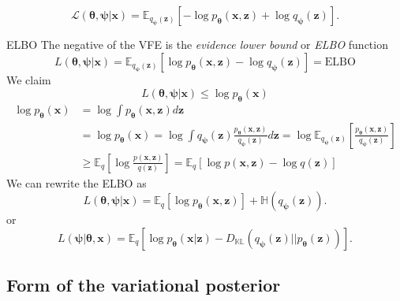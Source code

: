 \documentclass[../main.tex]{subfiles}
\begin{document}
\[
\mathcal{L}(\boldsymbol{\theta}, \boldsymbol{\psi} | \boldsymbol{x}) = \mathbb{E}_{q_{\boldsymbol{\psi}}(\boldsymbol{z})}  \left[ - \log p_{\boldsymbol{\theta}}(\boldsymbol{x}, \boldsymbol{z}) + \log q_{\boldsymbol{\psi}}(\boldsymbol{z}) \right] .
\]

\begin{note}{ELBO}
The negative of the VFE is the \emph{evidence lower bound} or \emph{ELBO} function
\[
L(\boldsymbol{\theta}, \boldsymbol{\psi} | \boldsymbol{x}) = \mathbb{E}_{q_{\boldsymbol{\psi}}(\boldsymbol{z})} \left[ \log p_{\boldsymbol{\theta}}(\boldsymbol{x}, \boldsymbol{z})  - \log q_{\boldsymbol{\psi}}(\boldsymbol{z}) \right]  = \text{ELBO}
\]
We claim
\[
L(\boldsymbol{\theta}, \boldsymbol{\psi} | \boldsymbol{x}) \le  \log p_{\boldsymbol{\theta}}(\boldsymbol{x})
\]
\[
\begin{aligned}
\log p_{\boldsymbol{\theta}}(\boldsymbol{x}) &= \log \int p_{\boldsymbol{\theta}}(\boldsymbol{x}, \boldsymbol{z}) d\boldsymbol{z} \\
&= \log p_{\boldsymbol{\theta}}(\boldsymbol{x}) = \log \int q_{\boldsymbol{\psi}}(\boldsymbol{z}) \frac{p_{\boldsymbol{\theta}}(\boldsymbol{x}, \boldsymbol{z})}{q_{\boldsymbol{\psi}}(\boldsymbol{z})}d\boldsymbol{z} = \log \mathbb{E}_{q_{\boldsymbol{\psi}}(\boldsymbol{z})} \left[ \frac{p_{\boldsymbol{\theta}}(\boldsymbol{x},\boldsymbol{z})}{q_{\boldsymbol{\psi}}(\boldsymbol{z})} \right]  \\
& \ge  \mathbb{E}_{q} \left[ \log \frac{p(\boldsymbol{x}, \boldsymbol{z})}{q(\boldsymbol{z})} \right] = \mathbb{E}_{q} \left[ \log p(\boldsymbol{x}, \boldsymbol{z}) - \log q(\boldsymbol{z}) \right] 
\end{aligned}
\]
We can rewrite the ELBO as
\[
L(\boldsymbol{\theta}, \boldsymbol{\psi} | \boldsymbol{x}) = \mathbb{E}_{q} \left[ \log p_{\boldsymbol{\theta}}(\boldsymbol{x}, \boldsymbol{z}) \right]  + \mathbb{H} \left( q_{\boldsymbol{\psi}}(\boldsymbol{z}) \right) .
\]
or 
\[
L(\boldsymbol{\psi} | \boldsymbol{\theta}, \boldsymbol{x})  = \mathbb{E}_{q} \left[ \log p_{\boldsymbol{\theta}}(\boldsymbol{x} | \boldsymbol{z}) - D_{\mathbb{KL}} (q_{\boldsymbol{\psi}}(\boldsymbol{z})|| p_{\boldsymbol{\theta}}(\boldsymbol{z})) \right] .
\]



\end{note} 

\subsection{Form of the variational posterior}
\end{document}
